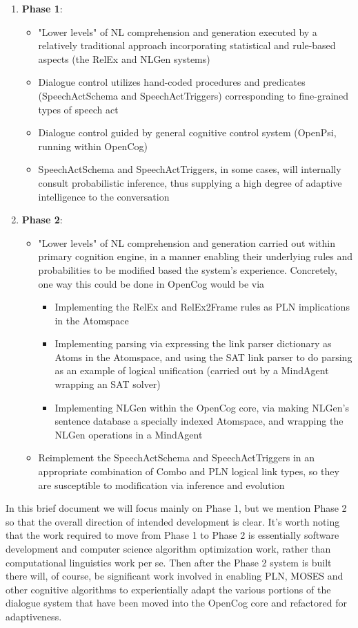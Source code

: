 \documentclass[10pt]{article}
\begin{document}
\begin{enumerate}
\item {\bf Phase 1}: 
\begin{itemize}
\item "Lower levels" of NL comprehension and generation executed by a relatively traditional approach incorporating statistical and rule-based aspects (the RelEx and NLGen systems)
\item Dialogue control utilizes hand-coded procedures and predicates (SpeechActSchema and SpeechActTriggers) corresponding to fine-grained types of speech act
\item Dialogue control guided by general cognitive control system (OpenPsi, running within OpenCog)
\item SpeechActSchema and SpeechActTriggers, in some cases, will internally consult probabilistic inference, thus supplying a high degree of adaptive intelligence to the conversation
\end{itemize} 

\item {\bf Phase 2}:
\begin{itemize}
\item "Lower levels" of NL comprehension and generation carried out within primary cognition engine, in a manner enabling their underlying rules and probabilities to be modified based the system's experience.  Concretely, one way this could be done in OpenCog would be via
\begin{itemize}
\item Implementing the RelEx and RelEx2Frame rules as PLN implications in the Atomspace
\item Implementing parsing via expressing the link parser dictionary as Atoms in the Atomspace, and using the SAT link parser to do parsing as an example of logical unification (carried out by a MindAgent wrapping an SAT solver)
\item Implementing NLGen within the OpenCog core, via making NLGen's sentence database a specially indexed Atomspace, and wrapping the NLGen operations in a MindAgent 
\end{itemize}
\item Reimplement the SpeechActSchema and SpeechActTriggers in an appropriate combination of Combo and PLN logical link types, so they are susceptible to modification via inference and evolution
\end{itemize} 
\end{enumerate}

In this brief document we will focus mainly on Phase 1, but we mention Phase 2 so that the overall direction of intended development is clear.  It's worth noting that the work required to move from Phase 1 to Phase 2 is essentially software development and computer science algorithm optimization work, rather than computational linguistics work per se.  Then after the Phase 2 system is built there will, of course, be significant work involved in enabling PLN, MOSES and other cognitive algorithms to experientially adapt the various portions of the dialogue system that have been moved into the OpenCog core and refactored for adaptiveness.
\end{document}

